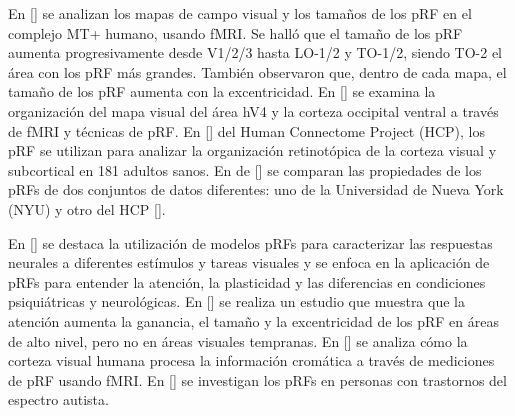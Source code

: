 En [\cite{amano_visual_2009}] se analizan los mapas de campo visual y los tamaños de los pRF en el complejo MT+ humano, usando fMRI. Se halló que el tamaño de los pRF aumenta progresivamente desde V1/2/3 hasta LO-1/2 y TO-1/2, siendo TO-2 el área con los pRF más grandes. También observaron que, dentro de cada mapa, el tamaño de los pRF aumenta con la excentricidad. En [\cite{winawer_mapping_2010}] se examina la organización del mapa visual del área hV4 y la corteza occipital ventral a través de fMRI y técnicas de pRF. En [\cite{benson_human_2018}] del Human Connectome Project (HCP), los pRF se utilizan para analizar la organización retinotópica de la corteza visual y subcortical en 181 adultos sanos. En de [\cite{himmelberg_cross-dataset_2021}] se comparan las propiedades de los pRFs de dos conjuntos de datos diferentes: uno de la Universidad de Nueva York (NYU) y otro del HCP [\cite{benson_human_2018}].

En [\cite{wandell_computational_2015}] se destaca la utilización de modelos pRFs para caracterizar las respuestas neurales a diferentes estímulos y tareas visuales y se enfoca en la aplicación de pRFs para entender la atención, la plasticidad y las diferencias en condiciones psiquiátricas y neurológicas. En [\cite{kay_attention_2015}] se realiza un estudio que muestra que la atención aumenta la ganancia, el tamaño y la excentricidad de los pRF en áreas de alto nivel, pero no en áreas visuales tempranas. En [\cite{welbourne_population_2018}] se analiza cómo la corteza visual humana procesa la información cromática a través de mediciones de pRF usando fMRI. En [\cite{schwarzkopf_larger_2014}] se investigan los pRFs en personas con trastornos del espectro autista.




